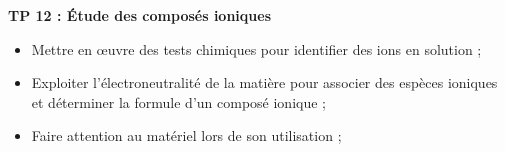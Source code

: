 
\renewcommand{\thesection}{\textcolor{red}{Partie \Roman{section} -}}
\renewcommand{\thesubsection}{\textcolor{red}{\Roman{section}.\arabic{subsection}}}
\renewcommand{\thesubsubsection}{\textcolor{red}{\Roman{section}.\arabic{subsection}.\alph{subsubsection}}}

\setcounter{section}{0}
\setcounter{document}{0}
\sndEnTeteTPOnze

\begin{center}
\begin{mdframed}[style=titr, leftmargin=60pt, rightmargin=60pt, innertopmargin=7pt, innerbottommargin=7pt, innerrightmargin=8pt, innerleftmargin=8pt]

\begin{center}
\large{\textbf{TP 12 : \'{E}tude des composés ioniques
}}
\end{center}
\end{mdframed}
\end{center}


\begin{tcolorbox}[colback=blue!5!white,colframe=blue!75!black,title=Objectifs de la séance :]
\begin{itemize}
    \item Mettre en œuvre des tests chimiques pour identifier des ions en solution  ;
    \item Exploiter l’électroneutralité de la matière pour associer des espèces ioniques et déterminer la formule d’un composé ionique ;
\end{itemize}
\end{tcolorbox}

\begin{tcolorbox}[colback=red!5!white,colframe=red!75!black,title= Consignes :]
\begin{itemize}
    \item Faire attention au matériel lors de son utilisation ;
\end{itemize}
\end{tcolorbox}

